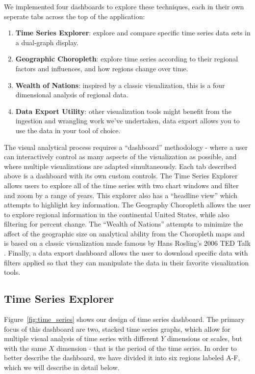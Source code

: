 \documentclass{sigchi}
\begin{document}
We implemented four dashboards to explore these techniques, each in their own seperate tabs across the top of the application:

\begin{enumerate}
    \item \textbf{Time Series Explorer}: explore and compare specific time series data sets in a dual-graph display.
    \item \textbf{Geographic Choropleth}: explore time series according to their regional factors and influences, and how regions change over time.
    \item \textbf{Wealth of Nations}: inspired by a classic visualization, this is a four dimensional analysis of regional data.
    \item \textbf{Data Export Utility}: other visualization tools might benefit from the ingestion and wrangling work we've undertaken, data export allows you to use the data in your tool of choice.
\end{enumerate}

The visual analytical process requires a ``dashboard'' methodology - where a user can interactively control as many aspects of the visualization as possible, and where multiple visualizations are adapted simultaneously. Each tab described above is a dashboard with its own custom controls. The Time Series Explorer allows users to explore all of the time series with two chart windows and filter and zoom by a range of years. This explorer also has a ``headline view'' which attempts to highlight key information. The Geography Choropleth allows the user to explore regional information in the continental United States, while also filtering for percent change. The ``Wealth of Nations'' attempts to minimize the affect of the geographic size on analytical ability from the Choropleth maps and is based on a classic visualization made famous by Hans Rosling's 2006 TED Talk \cite{_wealth_????}. Finally, a data export dashboard allows the user to download specific data with filters applied so that they can manipulate the data in their favorite visualization tools.

\subsection{Time Series Explorer}

Figure~\ref{fig:time_series} shows our design of time series dashboard. The primary focus of this dashboard are two, stacked time series graphs, which allow for multiple visual analysis of time series with different $Y$ dimensions or scales, but with the same $X$ dimension - that is the period of the time series. In order to better describe the dashboard, we have divided it into six regions labeled A-F, which we will describe in detail below.
\end{document}
